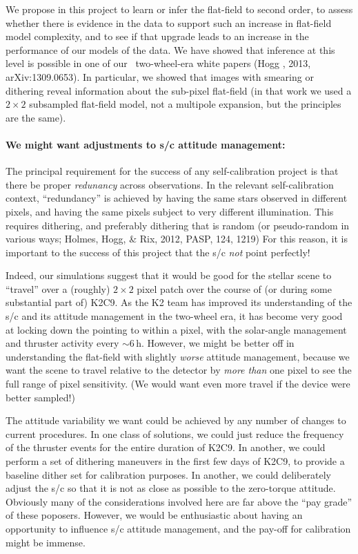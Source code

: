 \documentclass[12pt,preprint]{aastex}
\begin{document}
We propose in this project to learn or infer the flat-field to second
order, to assess whether there is evidence in the data to support such
an increase in flat-field model complexity, and to see if that upgrade
leads to an increase in the performance of our models of the data.
We have showed that inference at this level is possible in one of our
\kepler\ two-wheel-era white papers (Hogg \etal, 2013, arXiv:1309.0653).
In particular, we showed that images with smearing or dithering reveal
information about the sub-pixel flat-field (in that work we used a
$2\times 2$ subsampled flat-field model, not a multipole expansion,
but the principles are the same).

\paragraph{We might want adjustments to s/c attitude management:}

The principal requirement for the success of any self-calibration project
is that there be proper \emph{redunancy} across observations.
In the relevant self-calibration context, ``redundancy'' is achieved
by having the same stars observed in different pixels, and having the
same pixels subject to very different illumination.
This requires dithering, and preferably dithering that is random (or
pseudo-random in various ways; Holmes, Hogg, \& Rix, 2012, PASP, 124,
1219)
For this reason, it is important to the success of this project that
the s/c \emph{not} point perfectly!

Indeed, our simulations suggest that it would be good for the stellar
scene to ``travel'' over a (roughly) $2\times2$ pixel patch over the
course of (or during some substantial part of) K2C9.
As the K2 team has improved its understanding of the s/c and its
attitude management in the two-wheel era, it has become very good at
locking down the pointing to within a pixel, with the solar-angle
management and thruster activity every $\sim 6$\,h.
However, we might be better off in understanding the flat-field with
slightly \emph{worse} attitude management, because we want the scene
to travel relative to the detector by \emph{more than} one pixel to
see the full range of pixel sensitivity.
(We would want even more travel if the device were better sampled!)

The attitude variability we want could be achieved by any number of
changes to current procedures.
In one class of solutions, we could just reduce the frequency of the
thruster events for the entire duration of K2C9.
In another, we could perform a set of dithering maneuvers in the first
few days of K2C9, to provide a baseline dither set for calibration
purposes.
In another, we could deliberately adjust the s/c so that it is not as
close as possible to the zero-torque attitude.
Obviously many of the considerations involved here are far above the 
``pay grade'' of these poposers.
However, we would be enthusiastic about having an opportunity to influence
s/c attitude management, and the pay-off for calibration might be immense.
\end{document}
